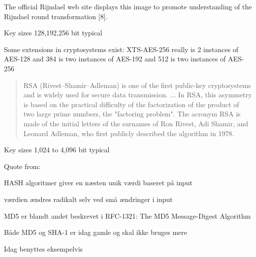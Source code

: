 \documentclass[Screen16to9,17pt]{foils}
\begin{document}


\begin{list2}
\item The official Rijndael web site displays this image to promote understanding of the Rijndael round transformation [8].
\item Key sizes 128,192,256 bit typical
\item Some extensions in cryptosystems exist: XTS-AES-256 really is 2 instances of AES-128 and 384 is two instances of AES-192 and 512 is two instances of AES-256
\item {}
\end{list2}



\begin{quote}
RSA (Rivest–Shamir–Adleman) is one of the first public-key cryptosystems and is widely used for secure data transmission. ...
In RSA, this asymmetry is based on the practical difficulty of the factorization of the product of two large prime numbers, the "factoring problem". The acronym RSA is made of the initial letters of the surnames of Ron Rivest, Adi Shamir, and Leonard Adleman, who first publicly described the algorithm in 1978.
\end{quote}

\begin{list2}
\item Key sizes 1,024 to 4,096 bit typical
\item  Quote from: 
\end{list2}




\begin{list1}
\item HASH algoritmer giver en næsten unik værdi baseret på input
\item værdien ændres radikalt selv ved små ændringer i input
\item MD5 er blandt andet beskrevet i RFC-1321: The MD5 Message-Digest
  Algorithm
\item Både MD5 og SHA-1 er idag gamle og skal ikke bruges mere
\item Idag benyttes eksempelvis 
\end{list1}
\end{document}
